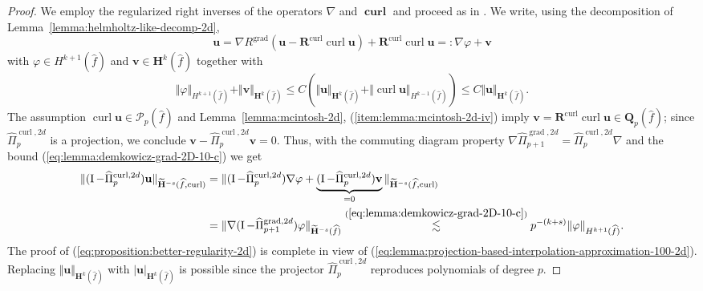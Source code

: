 \documentclass{article}
\newcommand{\hatPicurlcomtwod}{\widehat \Pi^{\operatorname*{curl},2d}_p}
\newcommand{\hatPigradcomtwod}{\widehat\Pi^{\operatorname*{grad},2d}_{p+1}}
\begin{document}
\begin{proof}
We employ the regularized right inverses of the operators $\nabla$ and
$\operatorname*{\mathbf{curl}}$ and proceed as in \cite[Lemma~{5.8}]{hiptmair08}. We
write, using the decomposition of Lemma~\ref{lemma:helmholtz-like-decomp-2d},
\[
{\mathbf{u}}=\nabla R^{\operatorname*{grad}}({\mathbf{u}}-{\mathbf{R}%
}^{\operatorname*{curl}}\operatorname*{curl}{\mathbf{u}})+{\mathbf{R}}^{\operatorname*{curl}}\operatorname*{curl}{\mathbf{u}}=:\nabla
\varphi+{\mathbf{v}}%
\]
with $\varphi\in H^{k+1}(\widehat{f})$ and ${\mathbf{v}}\in{\mathbf{H}}%
^{k}(\widehat{f})$ together with
\begin{equation}
\Vert\varphi\Vert_{H^{k+1}(\widehat{f})}+\Vert{\mathbf{v}}\Vert_{{\mathbf{H}%
}^{k}(\widehat{f})}\leq C\left(  \Vert{\mathbf{u}}\Vert_{{\mathbf{H}}%
^{k}(\widehat{f})}+\Vert\operatorname*{curl}{\mathbf{u}}\Vert_{{H%
}^{k-1}(\widehat{f})}\right)  \leq C\Vert{\mathbf{u}}\Vert_{{\mathbf{H}}%
^{k}(\widehat{f})}.
\label{eq:lemma:projection-based-interpolation-approximation-100-2d}%
\end{equation}
The assumption $\operatorname*{curl}{\mathbf{u}}\in {\mathcal P}_p(\widehat f)$
and %
Lemma~\ref{lemma:mcintosh-2d}, (\ref{item:lemma:mcintosh-2d-iv}) 
imply ${\mathbf{v}}={\mathbf{R}}%
^{\operatorname*{curl}}\operatorname*{curl}{\mathbf{u}}\in
\mathbf{Q}_p(\widehat{f})$; since
$\hatPicurlcomtwod$ is a projection, we conclude
${\mathbf{v}}-\hatPicurlcomtwod{\mathbf{v}}=0$. Thus,
with the commuting diagram property $\nabla\hatPigradcomtwod=\hatPicurlcomtwod\nabla$ 
and the bound (\ref{eq:lemma:demkowicz-grad-2D-10-c}) we get
\begin{align*}
\Vert(\operatorname{I}-\hatPicurlcomtwod){\mathbf{u}}\Vert
_{\widetilde{\mathbf{H}}^{-s}(\widehat{f},\operatorname{curl})} &= \Vert(\operatorname{I}-\hatPicurlcomtwod)\nabla\varphi+\underbrace{(\operatorname{I}-\hatPicurlcomtwod){\mathbf{v}}}_{=0}\Vert_{\widetilde{\mathbf{H}}^{-s}(\widehat{f},\operatorname{curl})} \\
&= \Vert\nabla(\operatorname{I}-\hatPigradcomtwod)\varphi\Vert_{\widetilde{\mathbf{H}}^{-s}(\widehat{f})}
\stackrel{(\ref{eq:lemma:demkowicz-grad-2D-10-c})}{\lesssim} p^{-(k+s)}\Vert\varphi\Vert_{H^{k+1}(\widehat{f})}.
\end{align*}
The proof of (\ref{eq:proposition:better-regularity-2d})
is complete in view of
(\ref{eq:lemma:projection-based-interpolation-approximation-100-2d}). Replacing
$\Vert{\mathbf{u}}\Vert_{{\mathbf{H}}^{k}(\widehat{f})}$ with $|{\mathbf{u}%
}|_{{\mathbf{H}}^{k}(\widehat{f})}$ is possible since the
projector $\hatPicurlcomtwod$ reproduces polynomials
of degree $p$.
\end{proof}
\end{document}
